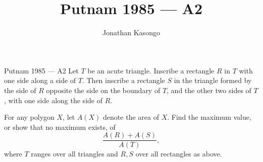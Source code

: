 \documentclass{article}
\author{Jonathan Kasongo}
\title{Putnam 1985 --- A2}
\begin{document}
\maketitle

\begin{problem}{Putnam 1985 --- A2}
Let $T$ be an acute triangle. Inscribe a rectangle $R$ in $T$ with one
side along a side of $T$. Then inscribe a rectangle $S$ in the triangle
formed by the side of $R$ opposite the side on the boundary of $T$,
and the other two sides of $T$, with one side along the side of
$R$.
\vspace{0.2cm}

For any polygon $X$, let $A(X)$ denote the area of $X$. Find the
maximum value, or show that no maximum exists, of
$$
\frac{A(R)+A(S)}{A(T)},
$$
where $T$ ranges over all triangles and $R,S$ over all rectangles as above.
\end{problem}
\end{document}
